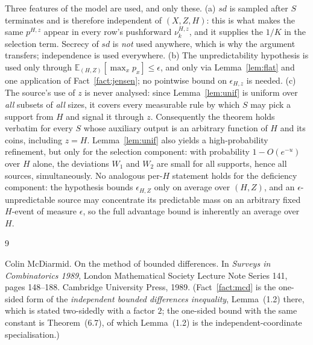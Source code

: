 \documentclass{conjura-solution}
\newcommand{\sd}{\mathit{sd}}
\begin{document}
\begin{remark}
Three features of the model are used, and only these. (a) $\sd$ is sampled after $S$ terminates and
is therefore independent of $(X,Z,H)$: this is what makes the same $p^{H,z}$ appear in every row's
pushforward $\nu^{H,z}_{k}$, and it supplies the $1/K$ in the selection term. Secrecy of $\sd$ is
\emph{not} used anywhere, which is why the argument transfers; independence is used everywhere. (b)
The unpredictability hypothesis is used only through $\mathbb{E}_{(H,Z)}[\max_x p_x] \le \epsilon$,
and only via Lemma~\ref{lem:flat} and one application of Fact~\ref{fact:jensen}; no pointwise bound on
$\epsilon_{H,z}$ is needed. (c) The source's use of $z$ is never analysed: since
Lemma~\ref{lem:unif} is uniform over \emph{all} subsets of \emph{all} sizes, it covers every
measurable rule by which $S$ may pick a support from $H$ and signal it through $z$. Consequently the
theorem holds verbatim for every $S$ whose auxiliary output is an arbitrary function of $H$ and its
coins, including $z = H$. Lemma~\ref{lem:unif} also yields a high-probability refinement, but only
for the selection component: with probability $1 - O(e^{-u})$ over $H$ alone, the deviations
$W_{1}$ and $W_{2}$ are small for all supports, hence all sources, simultaneously. No analogous per-$H$ statement holds for
the deficiency component: the hypothesis bounds $\epsilon_{H,Z}$ only on average over $(H,Z)$, and
an $\epsilon$-unpredictable source may concentrate its predictable mass on an arbitrary fixed $H$-event of
measure $\epsilon$, so the full advantage bound is inherently an average over $H$.
\end{remark}

\begin{conjurabibliography}{9}

Colin McDiarmid.
\newblock On the method of bounded differences.
\newblock In \emph{Surveys in Combinatorics 1989}, London Mathematical Society Lecture Note
Series 141, pages 148--188. Cambridge University Press, 1989.
\newblock (Fact~\ref{fact:mcd} is the one-sided form of the \emph{independent bounded differences
inequality}, Lemma~(1.2) there, which is stated two-sidedly with a factor $2$; the one-sided bound
with the same constant is Theorem~(6.7), of which Lemma~(1.2) is the independent-coordinate
specialisation.)

\end{conjurabibliography}
\end{document}
